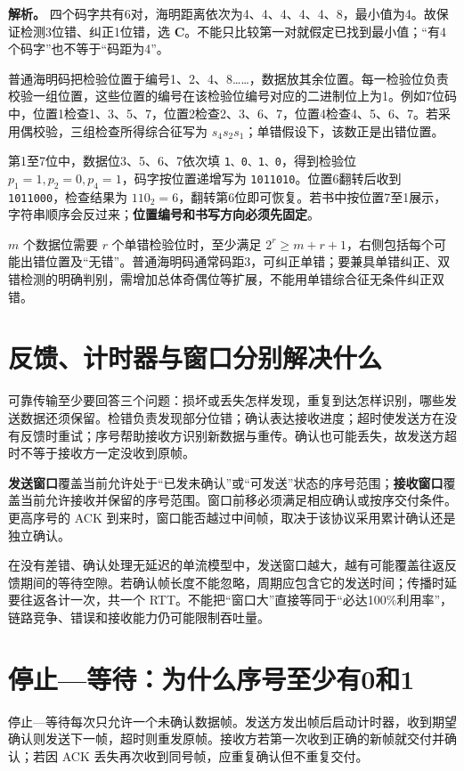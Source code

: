 \textbf{解析。} 四个码字共有6对，海明距离依次为4、4、4、4、4、8，最小值为4。故保证检测3位错、纠正1位错，选 \textbf{C}。不能只比较第一对就假定已找到最小值；``有4个码字''也不等于``码距为4''。

普通海明码把检验位置于编号1、2、4、8\ldots\ldots，数据放其余位置。每一检验位负责校验一组位置，这些位置的编号在该检验位编号对应的二进制位上为1。例如7位码中，位置1检查1、3、5、7，位置2检查2、3、6、7，位置4检查4、5、6、7。若采用偶校验，三组检查所得综合征写为 \(s_4s_2s_1\)；单错假设下，该数正是出错位置。

第1至7位中，数据位3、5、6、7依次填 \texttt{1、0、1、0}，得到检验位 \(p_1=1,p_2=0,p_4=1\)，码字按位置递增写为 \texttt{1011010}。位置6翻转后收到 \texttt{1011000}，检查结果为 \(110_2=6\)，翻转第6位即可恢复。若书中按位置7至1展示，字符串顺序会反过来；\textbf{位置编号和书写方向必须先固定}。

\(m\) 个数据位需要 \(r\) 个单错检验位时，至少满足 \(2^r\ge m+r+1\)，右侧包括每个可能出错位置及``无错''。普通海明码通常码距3，可纠正单错；要兼具单错纠正、双错检测的明确判别，需增加总体奇偶位等扩展，不能用单错综合征无条件纠正双错。

\section{反馈、计时器与窗口分别解决什么}\label{CN03-05}

可靠传输至少要回答三个问题：损坏或丢失怎样发现，重复到达怎样识别，哪些发送数据还须保留。检错负责发现部分位错；确认表达接收进度；超时使发送方在没有反馈时重试；序号帮助接收方识别新数据与重传。确认也可能丢失，故发送方超时不等于接收方一定没收到原帧。

\textbf{发送窗口}覆盖当前允许处于``已发未确认''或``可发送''状态的序号范围；\textbf{接收窗口}覆盖当前允许接收并保留的序号范围。窗口前移必须满足相应确认或按序交付条件。更高序号的 ACK 到来时，窗口能否越过中间帧，取决于该协议采用累计确认还是独立确认。

在没有差错、确认处理无延迟的单流模型中，发送窗口越大，越有可能覆盖往返反馈期间的等待空隙。若确认帧长度不能忽略，周期应包含它的发送时间；传播时延要往返各计一次，共一个 RTT。不能把``窗口大''直接等同于``必达100\%利用率''，链路竞争、错误和接收能力仍可能限制吞吐量。

\section{停止---等待：为什么序号至少有0和1}\label{CN03-06}

停止---等待每次只允许一个未确认数据帧。发送方发出帧后启动计时器，收到期望确认则发送下一帧，超时则重发原帧。接收方若第一次收到正确的新帧就交付并确认；若因 ACK 丢失再次收到同号帧，应重复确认但不重复交付。

